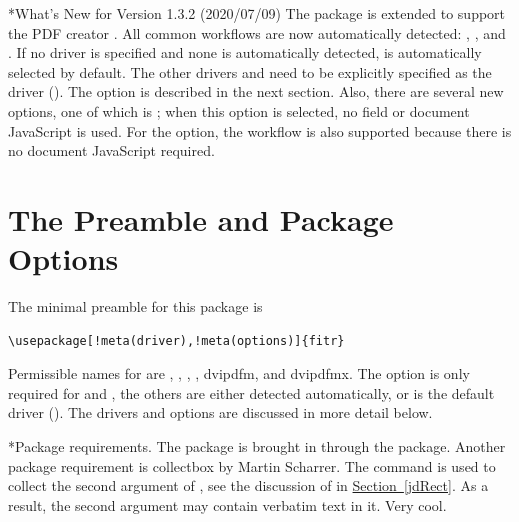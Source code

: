 \documentclass{article}
\makeatletter
\renewcommand{\paragraph}
    {\@startsection{paragraph}{4}{0pt}{6pt}{-3pt}
    {\normalfont\normalsize\bfseries}}
\makeatother
\begin{document}
\paragraph*{What's New for Version 1.3.2 (2020/07/09)} The package is extended to support
the PDF creator . All common workflows are now automatically
detected: , , and . If  no driver is
specified and none is automatically detected,  is automatically
selected by default. The other drivers  and  need
to be explicitly specified as the driver (). The 
option is described in the next section. Also, there are several new options,
one of which is ; when this option is selected, no field or
document JavaScript is used. For the  option, the workflow
 is also supported because there is no document
JavaScript required.

\section{The Preamble and Package Options}

The minimal preamble for this package is
\begin{Verbatim}[xleftmargin=\amtIndent,commandchars=!()]
\usepackage[!meta(driver),!meta(options)]{fitr}
\end{Verbatim}
Permissible names for  are , ,
, , \textsf{dvipdfm}, and \textsf{dvipdfmx}. The
 option is only required for  and ,
the others are either detected automatically, or is the default driver
(). The drivers and options are discussed in more detail below.

\paragraph*{Package requirements.} The  package is brought in through the  package.
Another package requirement is \textsf{collectbox} by Martin Scharrer.
The  command is used to collect the second argument of
, see the discussion of  in \hyperref[jdRect]{Section~\ref*{jdRect}}.
As a result, the second argument may contain verbatim text in it. Very cool.
\end{document}
